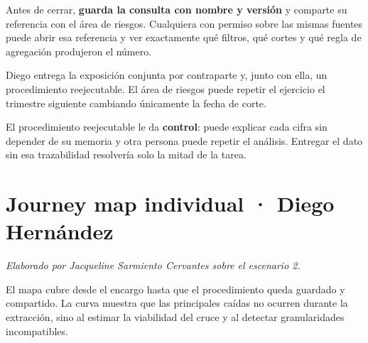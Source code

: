 Antes de cerrar, \textbf{guarda la consulta con nombre y versión} y comparte su referencia con
el área de riesgos. Cualquiera con permiso sobre las mismas fuentes puede abrir esa referencia
y ver exactamente qué filtros, qué cortes y qué regla de agregación produjeron el número.


Diego entrega la exposición conjunta por contraparte y, junto con ella, un procedimiento
reejecutable. El área de riesgos puede repetir el ejercicio el trimestre siguiente cambiando
únicamente la fecha de corte.

El procedimiento reejecutable le da \textbf{control}: puede explicar cada cifra sin depender
de su memoria y otra persona puede repetir el análisis. Entregar el dato sin esa trazabilidad
resolvería solo la mitad de la tarea.


\begin{uxlist}
\end{uxlist}

\clearpage
\section{Journey map individual · Diego Hernández}

\textit{Elaborado por Jacqueline Sarmiento Cervantes sobre el escenario 2.}

El mapa cubre desde el encargo hasta que el procedimiento queda guardado y compartido. La
curva muestra que las principales caídas no ocurren durante la extracción, sino al estimar la
viabilidad del cruce y al detectar granularidades incompatibles.

